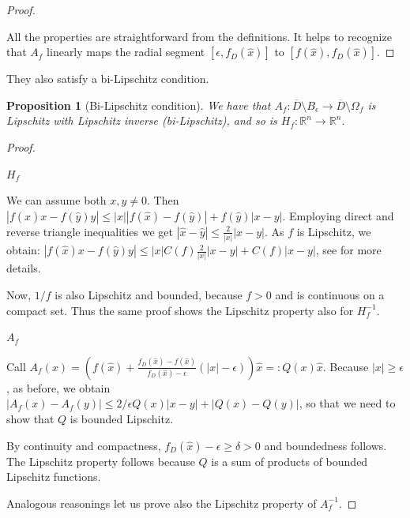 \documentclass[english,a4paper,9pt,oneside]{scrbook}	%
\theoremstyle{break}
\newtheorem{prop}[equation]{Proposition}
\newenvironment{mproof}[1][\proofname]{%
  \begin{proof}[#1]$ $\par\nobreak\ignorespaces
}{%
  \end{proof}
}
\renewcommand*{\proofname}{Proof}
\theoremstyle{remark}
\newcommand{\mR}{\mathbb{R}}
\newcommand{\xh}{\hat{x}}
\newcommand{\yh}{\hat{y}}
\newcommand{\eps}{\epsilon}
\begin{document}
\begin{mproof}
All the properties are straightforward from the definitions. It helps to recognize that $A_f$ linearly maps the radial segment $[\eps, f_D(\xh)]$ to $[f(\xh), f_D(\xh)]$.
\end{mproof}


They also satisfy a bi-Lipschitz condition.

\begin{prop}[Bi-Lipschitz condition]
We have that $A_f:  \overline{D}\setminus B_\eps\rightarrow \overline{D}\setminus \Omega_f $ is Lipschitz with Lipschitz inverse (bi-Lipschitz), and so is $H_f: \mR^n \rightarrow \mR^n$.
\end{prop}

\begin{mproof}


\underline{$H_f$}

We can assume both $x,y\neq 0$. Then $|f(\xh)x-f(\yh)y|\leq |x||f(\xh)-f(\yh)|+f(\yh)|x-y|$. Employing direct and reverse triangle inequalities we get $|\xh-\yh|\leq \frac{2}{|x|}|x-y|$.
As $f$ is Lipschitz, we obtain:  $|f(\xh)x-f(\yh)y|\leq |x|C(f)\frac{2}{|x|}|x-y|+C(f)|x-y|$, see \cite{deckelnick} for more details.

Now, $1/f$ is also Lipschitz and bounded, because $f>0$ and is continuous on a compact set. Thus the same proof shows the Lipschitz property also for $H_f^{-1}$.

\underline{$A_f$}

Call $A_f(x)=\left (  f(\xh)+\frac{f_D(\xh)-f(\xh)}{f_D(\xh)-\eps}(|x|-\eps) \right )\xh =:Q(x)\xh $. Because $|x|\geq\eps$, as before, we obtain $|A_f(x)-A_f(y)|\leq 2/\eps Q(x) |x-y|+|Q(x)-Q(y)|$, so that we need to show that $Q$ is bounded Lipschitz.

By continuity and compactness, $f_D(\xh)-\eps\geq \delta >0$ and boundedness follows. The Lipschitz property follows because $Q$ is a sum of products of bounded Lipschitz functions.

Analogous reasonings let us prove also the Lipschitz property of $A_f^{-1}$.
\end{mproof}
\end{document}
